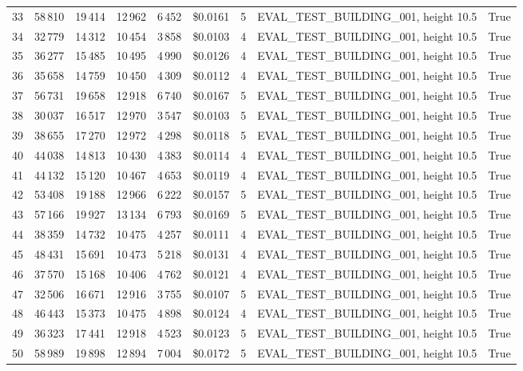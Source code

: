\documentclass[a4paper,11pt]{article}
\begin{document}
\begin{table}[ht]
\begin{tabular}{r r r r r r r p{3cm} l}
33 & 58\,810 & 19\,414 & 12\,962 & 6\,452 & \$0.0161 & 5 & EVAL\_TEST\_BUILDING\_001, height 10.5 & True \\
34 & 32\,779 & 14\,312 & 10\,454 & 3\,858 & \$0.0103 & 4 & EVAL\_TEST\_BUILDING\_001, height 10.5 & True \\
35 & 36\,277 & 15\,485 & 10\,495 & 4\,990 & \$0.0126 & 4 & EVAL\_TEST\_BUILDING\_001, height 10.5 & True \\
36 & 35\,658 & 14\,759 & 10\,450 & 4\,309 & \$0.0112 & 4 & EVAL\_TEST\_BUILDING\_001, height 10.5 & True \\
37 & 56\,731 & 19\,658 & 12\,918 & 6\,740 & \$0.0167 & 5 & EVAL\_TEST\_BUILDING\_001, height 10.5 & True \\
38 & 30\,037 & 16\,517 & 12\,970 & 3\,547 & \$0.0103 & 5 & EVAL\_TEST\_BUILDING\_001, height 10.5 & True \\
39 & 38\,655 & 17\,270 & 12\,972 & 4\,298 & \$0.0118 & 5 & EVAL\_TEST\_BUILDING\_001, height 10.5 & True \\
40 & 44\,038 & 14\,813 & 10\,430 & 4\,383 & \$0.0114 & 4 & EVAL\_TEST\_BUILDING\_001, height 10.5 & True \\
41 & 44\,132 & 15\,120 & 10\,467 & 4\,653 & \$0.0119 & 4 & EVAL\_TEST\_BUILDING\_001, height 10.5 & True \\
42 & 53\,408 & 19\,188 & 12\,966 & 6\,222 & \$0.0157 & 5 & EVAL\_TEST\_BUILDING\_001, height 10.5 & True \\
43 & 57\,166 & 19\,927 & 13\,134 & 6\,793 & \$0.0169 & 5 & EVAL\_TEST\_BUILDING\_001, height 10.5 & True \\
44 & 38\,359 & 14\,732 & 10\,475 & 4\,257 & \$0.0111 & 4 & EVAL\_TEST\_BUILDING\_001, height 10.5 & True \\
45 & 48\,431 & 15\,691 & 10\,473 & 5\,218 & \$0.0131 & 4 & EVAL\_TEST\_BUILDING\_001, height 10.5 & True \\
46 & 37\,570 & 15\,168 & 10\,406 & 4\,762 & \$0.0121 & 4 & EVAL\_TEST\_BUILDING\_001, height 10.5 & True \\
47 & 32\,506 & 16\,671 & 12\,916 & 3\,755 & \$0.0107 & 5 & EVAL\_TEST\_BUILDING\_001, height 10.5 & True \\
48 & 46\,443 & 15\,373 & 10\,475 & 4\,898 & \$0.0124 & 4 & EVAL\_TEST\_BUILDING\_001, height 10.5 & True \\
49 & 36\,323 & 17\,441 & 12\,918 & 4\,523 & \$0.0123 & 5 & EVAL\_TEST\_BUILDING\_001, height 10.5 & True \\
50 & 58\,989 & 19\,898 & 12\,894 & 7\,004 & \$0.0172 & 5 & EVAL\_TEST\_BUILDING\_001, height 10.5 & True \\

\end{tabular}
\end{table}
\end{document}

